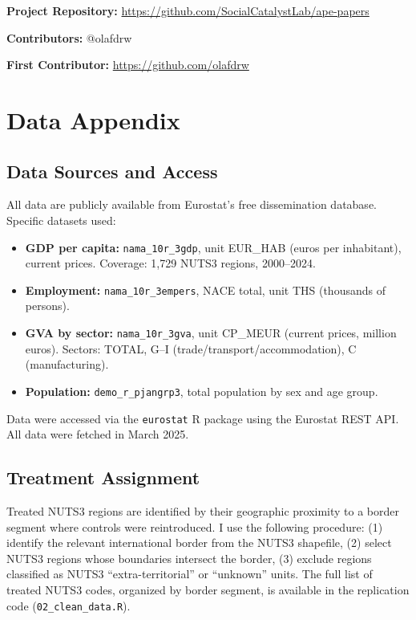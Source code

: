 \documentclass[12pt]{article}
\begin{document}
\noindent\textbf{Project Repository:} \url{https://github.com/SocialCatalystLab/ape-papers}

\noindent\textbf{Contributors:} @olafdrw

\noindent\textbf{First Contributor:} \url{https://github.com/olafdrw}

\label{apep_main_text_end}
\newpage


\newpage
\appendix

\section{Data Appendix}
\label{app:data}

\subsection{Data Sources and Access}

All data are publicly available from Eurostat's free dissemination database. Specific datasets used:

\begin{itemize}
    \item \textbf{GDP per capita:} \texttt{nama\_10r\_3gdp}, unit EUR\_HAB (euros per inhabitant), current prices. Coverage: 1,729 NUTS3 regions, 2000--2024.
    \item \textbf{Employment:} \texttt{nama\_10r\_3empers}, NACE total, unit THS (thousands of persons).
    \item \textbf{GVA by sector:} \texttt{nama\_10r\_3gva}, unit CP\_MEUR (current prices, million euros). Sectors: TOTAL, G--I (trade/transport/accommodation), C (manufacturing).
    \item \textbf{Population:} \texttt{demo\_r\_pjangrp3}, total population by sex and age group.
\end{itemize}

Data were accessed via the \texttt{eurostat} R package \citep{Lahti2017} using the Eurostat REST API. All data were fetched in March 2025.

\subsection{Treatment Assignment}

Treated NUTS3 regions are identified by their geographic proximity to a border segment where controls were reintroduced. I use the following procedure: (1) identify the relevant international border from the NUTS3 shapefile, (2) select NUTS3 regions whose boundaries intersect the border, (3) exclude regions classified as NUTS3 ``extra-territorial'' or ``unknown'' units. The full list of treated NUTS3 codes, organized by border segment, is available in the replication code (\texttt{02\_clean\_data.R}).
\end{document}
